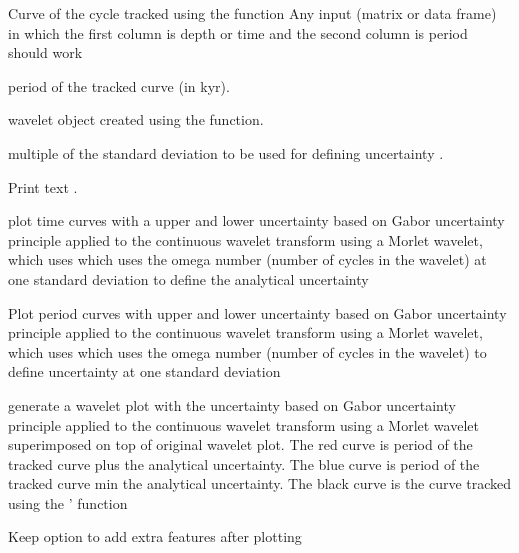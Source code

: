 \documentclass[a4paper]{book}
\begin{document}
\begin{Arguments}
\begin{ldescription}
\item[\code{tracked\_cycle}] Curve of the cycle tracked using the  function
Any input (matrix or data frame) in which the first column is depth or
time and the second column is period should work

\item[\code{period\_of\_tracked\_cycle}] period of the tracked curve (in kyr).

\item[\code{wavelet}] wavelet object created using the  function.

\item[\code{multi}] multiple of the standard deviation to be used for defining uncertainty .

\item[\code{verbose}] Print text .

\item[\code{genplot\_time}] plot time curves with a upper and lower uncertainty based on Gabor uncertainty principle applied to the
continuous wavelet transform using a Morlet wavelet, which uses which uses the omega number (number
of cycles in the wavelet) at one standard deviation to define the analytical uncertainty 

\item[\code{genplot\_uncertainty}] Plot period curves with upper and lower uncertainty based on Gabor uncertainty principle applied to the
continuous wavelet transform using a Morlet wavelet, which uses which uses the omega number
(number of cycles in the wavelet) to define uncertainty at one standard deviation 

\item[\code{genplot\_uncertainty\_wt}] generate a wavelet plot with the uncertainty based on Gabor uncertainty
principle applied to the continuous wavelet transform using a Morlet wavelet superimposed on top of
original wavelet plot. The red curve is period of the tracked curve plus the analytical uncertainty.
The blue curve is period of the tracked curve min the analytical uncertainty.
The  black curve is the curve tracked using the ' function 

\item[\code{keep\_editable}] Keep option to add extra features after plotting  


\end{ldescription}
\end{Arguments}
\end{document}
